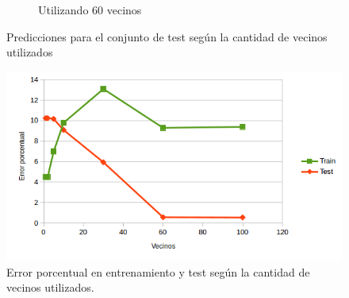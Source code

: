 \documentclass[12pt, a4paper]{article}
\begin{document}
\begin{figure}
\begin{subfigure}[b]{0.45\textwidth}
        \caption{Utilizando 60 vecinos}
    \end{subfigure}        
    \caption{Predicciones para el conjunto de test según la cantidad de vecinos utilizados}
\end{figure}

 \begin{figure}
    \centering
	\includegraphics[scale=0.8]{ejercicioe}
	\caption{Error porcentual en entrenamiento y test según la cantidad de vecinos utilizados.}
\end{figure}

\bigskip
\end{document}

